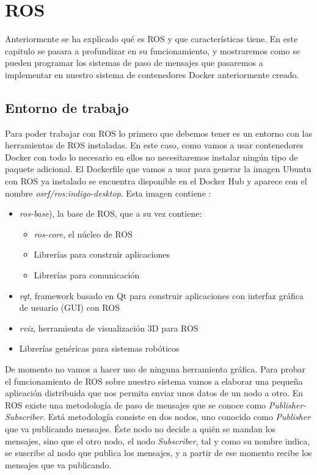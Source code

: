 \chapter{ROS}
Anteriormente se ha explicado qué es ROS y que características tiene. En este capitulo se pasara a profundizar en su funcionamiento, y mostraremos como se pueden programar los sistemas de paso de mensajes que pasaremos a implementar en nuestro sistema de contenedores Docker anteriormente creado.

	\section{Entorno de trabajo}
	Para poder trabajar con ROS lo primero que debemos tener es un entorno con las herramientas de ROS instaladas. En este caso, como vamos a usar contenedores Docker con todo lo necesario en ellos no necesitaremos instalar ningún tipo de paquete adicional. El Dockerfile que vamos a usar para generar la imagen Ubuntu con ROS ya instalado se encuentra disponible en el Docker Hub y aparece con el nombre \emph{osrf/ros:indigo-desktop}. Esta imagen contiene \cite{ros-installation}:
	\begin{itemize}
		\item \emph{ros-base}), la base de ROS, que a su vez contiene:
		\begin{itemize}
			\item \emph{ros-core}, el núcleo de ROS
			\item Librerías para construir aplicaciones
			\item Librerías para comunicación
		\end{itemize}
		\item \emph{rqt}, framework basado en Qt para construir aplicaciones con interfaz gráfica de usuario (GUI) con ROS
		\item \emph{rviz}, herramienta de visualización 3D para ROS
		\item Librerías genéricas para sistemas robóticos
		
	\end{itemize}
	
	De momento no vamos a hacer uso de ninguna herramienta gráfica. Para probar el funcionamiento de ROS sobre nuestro sistema vamos a elaborar una pequeña aplicación distribuida que nos permita enviar unos datos de un nodo a otro. En ROS existe una metodología de paso de mensajes que se conoce como \emph{Publisher-Subscriber}. Está metodología consiste en dos nodos, uno conocido como \emph{Publisher} que va publicando mensajes. Éste nodo no decide a quién se mandan los mensajes, sino que el otro nodo, el nodo \emph{Subscriber}, tal y como su nombre indica, se suscribe al nodo que publica los mensajes, y a partir de ese momento recibe los mensajes que va publicando.